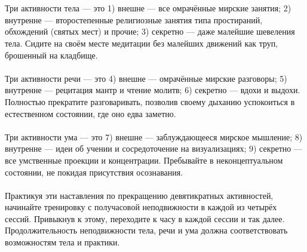\\ \\ Три активности тела — это 1) внешне — все омрачённые мирские занятия; 2) внутренне — второстепенные религиозные занятия типа простираний, обхождений (святых мест) и прочие; 3) секретно — даже малейшие шевеления тела. Сидите на своём месте медитации без малейших движений как труп, брошенный на кладбище.
\\ \\ Три активности речи — это 4) внешне — омрачённые мирские разговоры; 5) внутренне — рецитация мантр и чтение молитв; 6) секретно — вдохи и выдохи. Полностью прекратите разговаривать, позволив своему дыханию успокоиться в естественном состоянии, где оно едва заметно.
\\ \\ Три активности ума — это 7) внешне — заблуждающееся мирское мышление; 8) внутренне — идеи об учении и сосредоточение на визуализациях; 9) секретно — все умственные проекции и концентрации. Пребывайте в неконцептуальном состоянии, не покидая присутствия осознавания.
\\ \\ Практикуя эти наставления по прекращению девятикратных активностей, начинайте тренировку с получасовой неподвижности в каждой из четырёх сессий. Привыкнув к этому, переходите к часу в каждой сессии и так далее. Продолжительность неподвижности тела, речи и ума должна соответствовать возможностям тела и практики.
